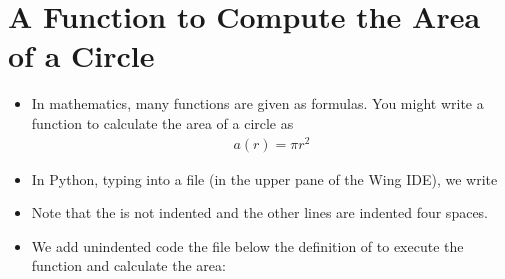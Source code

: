 \documentclass[letterpaper,10pt,english]{sphinxmanual}
\begin{document}
\section{A Function to Compute the Area of a Circle}
\label{\detokenize{lecture_notes/lec05_functions2:a-function-to-compute-the-area-of-a-circle}}\begin{itemize}
\item {} 
In mathematics, many functions are given as formulas. You might
write a function to calculate the area of a circle as
\begin{equation*}
\begin{split}a(r) = \pi r^2\end{split}
\end{equation*}
\item {} 
In Python, typing into a file (in the upper pane of the Wing IDE),
we write

%
\begin{sphinxVerbatim}[commandchars=\\\{\}]
 
      
        
     
\end{sphinxVerbatim}

\item {} 
Note that the  is not indented and the other lines are
indented four spaces.

\item {} 
We add unindented code the file below the definition of
 to execute the function and calculate
the area:

%
\begin{sphinxVerbatim}[commandchars=\\\{\}]
  
  
  
\end{sphinxVerbatim}


\end{itemize}
\end{document}
